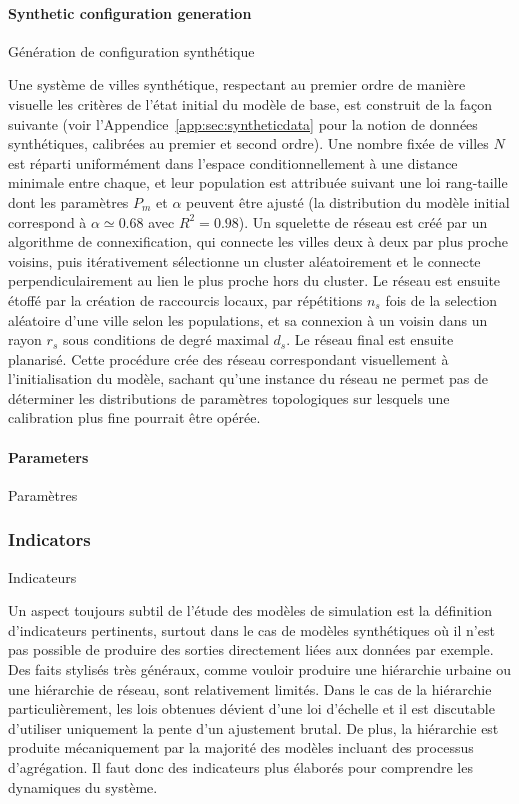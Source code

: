 \paragraph{Synthetic configuration generation}{Génération de configuration synthétique}

Une système de villes synthétique, respectant au premier ordre de manière visuelle les critères de l'état initial du modèle de base, est construit de la façon suivante (voir l'Appendice~\ref{app:sec:syntheticdata} pour la notion de données synthétiques, calibrées au premier et second ordre). Une nombre fixée de villes $N$ est réparti uniformément dans l'espace conditionnellement à une distance minimale entre chaque, et leur population est attribuée suivant une loi rang-taille dont les paramètres $P_{m}$ et $\alpha$ peuvent être ajusté (la distribution du modèle initial correspond à $\alpha\simeq 0.68$ avec $R^2=0.98$). Un squelette de réseau est créé par un algorithme de connexification, qui connecte les villes deux à deux par plus proche voisins, puis itérativement sélectionne un cluster aléatoirement et le connecte perpendiculairement au lien le plus proche hors du cluster. Le réseau est ensuite étoffé par la création de raccourcis locaux, par répétitions $n_s$ fois de la selection aléatoire d'une ville selon les populations, et sa connexion à un voisin dans un rayon $r_s$ sous conditions de degré maximal $d_s$. Le réseau final est ensuite planarisé. Cette procédure crée des réseau correspondant visuellement à l'initialisation du modèle, sachant qu'une instance du réseau ne permet pas de déterminer les distributions de paramètres topologiques sur lesquels une calibration plus fine pourrait être opérée.



\paragraph{Parameters}{Paramètres}




\subsubsection{Indicators}{Indicateurs}

Un aspect toujours subtil de l'étude des modèles de simulation est la définition d'indicateurs pertinents, surtout dans le cas de modèles synthétiques où il n'est pas possible de produire des sorties directement liées aux données par exemple. Des faits stylisés très généraux, comme vouloir produire une hiérarchie urbaine ou une hiérarchie de réseau, sont relativement limités. Dans le cas de la hiérarchie particulièrement, les lois obtenues dévient d'une loi d'échelle et il est discutable d'utiliser uniquement la pente d'un ajustement brutal. De plus, la hiérarchie est produite mécaniquement par la majorité des modèles incluant des processus d'agrégation. Il faut donc des indicateurs plus élaborés pour comprendre les dynamiques du système.


